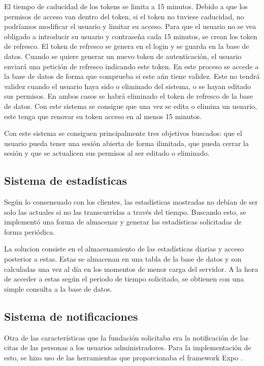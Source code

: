 El tiempo de caducidad de los tokens se limita a 15 minutos. Debido a que los permisos de acceso van dentro del token, si el token no tuviese caducidad, no podríamos modificar el usuario y limitar su acceso. Para que el usuario no se vea obligado a introducir su usuario y contraseña cada 15 minutos, se crean los token de refresco. El token de refresco se genera en el login y se guarda en la base de datos. Cuando se quiere generar un nuevo token de autenticación, el usuario enviará una petición de refresco indicando este token. En este proceso se accede a la base de datos de forma que comprueba si este aún tiene validez. Este no tendrá validez cuando el usuario haya sido o eliminado del sistema, o se hayan editado sus permisos. En ambos casos se habrá eliminado el token de refresco de la base de datos. Con este sistema se consigue que una vez se edita o elimina un usuario, este tenga que renovar su token acceso en al menos 15 minutos. 

Con este sistema se consiguen principalmente tres objetivos buscados: que el usuario pueda tener una sesión abierta de forma ilimitada, que pueda cerrar la sesión y que se actualicen sus permisos al ser editado o eliminado.

\subsection{Sistema de estadísticas}

Según lo consensuado con los clientes, las estadísticas mostradas no debían de ser solo las actuales si no las transcurridas a través del tiempo. Buscando esto, se implementó una forma de almacenar y generar las estadísticas solicitadas de forma periódica. 

La solucion consiste en el almacenamiento de las estadísticas diarias y acceso posterior a estas. Estas se almacenan en una tabla de la base de datos y son calculadas una vez al día en los momentos de menor carga del servidor. A la hora de acceder a estas según el periodo de tiempo solicitado, se obtienen con una simple consulta a la base de datos. 

\subsection{Sistema de notificaciones}

Otra de las características que la fundación solicitaba era la notificación de las citas de las personas a los usuarios administradores. Para la implementación de esto, se hizo uso de las herramientas que proporcionaba el framework Expo \cite{expo-notifications}. 

